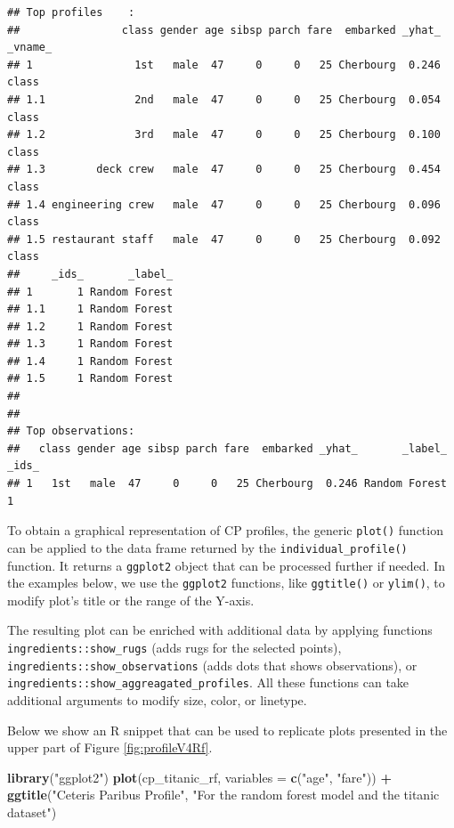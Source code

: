 \documentclass[]{krantz}
\newenvironment{Shaded}{\begin{snugshade}}{\end{snugshade}}
\newcommand{\DataTypeTok}[1]{\textcolor[rgb]{0.13,0.29,0.53}{#1}}
\newcommand{\KeywordTok}[1]{\textcolor[rgb]{0.13,0.29,0.53}{\textbf{#1}}}
\newcommand{\NormalTok}[1]{#1}
\newcommand{\OperatorTok}[1]{\textcolor[rgb]{0.81,0.36,0.00}{\textbf{#1}}}
\newcommand{\StringTok}[1]{\textcolor[rgb]{0.31,0.60,0.02}{#1}}
\begin{document}
\begin{verbatim}
## Top profiles    : 
##                class gender age sibsp parch fare  embarked _yhat_ _vname_
## 1                1st   male  47     0     0   25 Cherbourg  0.246   class
## 1.1              2nd   male  47     0     0   25 Cherbourg  0.054   class
## 1.2              3rd   male  47     0     0   25 Cherbourg  0.100   class
## 1.3        deck crew   male  47     0     0   25 Cherbourg  0.454   class
## 1.4 engineering crew   male  47     0     0   25 Cherbourg  0.096   class
## 1.5 restaurant staff   male  47     0     0   25 Cherbourg  0.092   class
##     _ids_       _label_
## 1       1 Random Forest
## 1.1     1 Random Forest
## 1.2     1 Random Forest
## 1.3     1 Random Forest
## 1.4     1 Random Forest
## 1.5     1 Random Forest
## 
## 
## Top observations:
##   class gender age sibsp parch fare  embarked _yhat_       _label_ _ids_
## 1   1st   male  47     0     0   25 Cherbourg  0.246 Random Forest     1
\end{verbatim}

To obtain a graphical representation of CP profiles, the generic \texttt{plot()} function can be applied to the data frame returned by the \texttt{individual\_profile()} function. It returns a \texttt{ggplot2} object that can be processed further if needed. In the examples below, we use the \texttt{ggplot2} functions, like \texttt{ggtitle()} or \texttt{ylim()}, to modify plot's title or the range of the Y-axis.

The resulting plot can be enriched with additional data by applying functions \texttt{ingredients::show\_rugs} (adds rugs for the selected points), \texttt{ingredients::show\_observations} (adds dots that shows observations), or \texttt{ingredients::show\_aggreagated\_profiles}. All these functions can take additional arguments to modify size, color, or linetype.

Below we show an R snippet that can be used to replicate plots presented in the upper part of Figure \ref{fig:profileV4Rf}.



\begin{Shaded}
\begin{Highlighting}[]
\KeywordTok{library}\NormalTok{(}\StringTok{"ggplot2"}\NormalTok{)}
\KeywordTok{plot}\NormalTok{(cp_titanic_rf, }\DataTypeTok{variables =} \KeywordTok{c}\NormalTok{(}\StringTok{"age"}\NormalTok{, }\StringTok{"fare"}\NormalTok{)) }\OperatorTok{+}
\StringTok{  }\KeywordTok{ggtitle}\NormalTok{(}\StringTok{"Ceteris Paribus Profile"}\NormalTok{, }
            \StringTok{"For the random forest model and the titanic dataset"}\NormalTok{)}
\end{Highlighting}
\end{Shaded}
\end{document}
